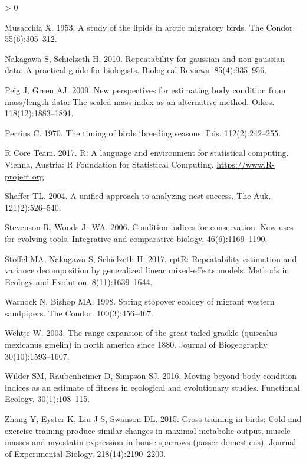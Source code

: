 \documentclass[
]{article}
\newlength{\cslhangindent}
\newenvironment{CSLReferences}[2] %
 {%
  \setlength{\parindent}{0pt}
  \ifodd #1 \everypar{\setlength{\hangindent}{\cslhangindent}}\ignorespaces\fi
  \ifnum #2 > 0
  \setlength{\parskip}{#2\baselineskip}
  \fi
 }%
 {}
\begin{document}
\begin{CSLReferences}{0}{0}
\leavevmode\hypertarget{ref-musacchia1953study}{}%
Musacchia X. 1953. A study of the lipids in arctic migratory birds. The
Condor. 55(6):305--312.

\leavevmode\hypertarget{ref-nakagawa2010repeatability}{}%
Nakagawa S, Schielzeth H. 2010. Repeatability for gaussian and
non-gaussian data: A practical guide for biologists. Biological Reviews.
85(4):935--956.

\leavevmode\hypertarget{ref-peig2009new}{}%
Peig J, Green AJ. 2009. New perspectives for estimating body condition
from mass/length data: The scaled mass index as an alternative method.
Oikos. 118(12):1883--1891.

\leavevmode\hypertarget{ref-perrins1970timing}{}%
Perrins C. 1970. The timing of birds `breeding seasons. Ibis.
112(2):242--255.

\leavevmode\hypertarget{ref-rcoreteam}{}%
R Core Team. 2017. R: A language and environment for statistical
computing. Vienna, Austria: R Foundation for Statistical Computing.
\url{https://www.R-project.org}.

\leavevmode\hypertarget{ref-shaffer2004unified}{}%
Shaffer TL. 2004. A unified approach to analyzing nest success. The Auk.
121(2):526--540.

\leavevmode\hypertarget{ref-stevenson2006condition}{}%
Stevenson R, Woods Jr WA. 2006. Condition indices for conservation: New
uses for evolving tools. Integrative and comparative biology.
46(6):1169--1190.

\leavevmode\hypertarget{ref-stoffel2017rptr}{}%
Stoffel MA, Nakagawa S, Schielzeth H. 2017. rptR: Repeatability
estimation and variance decomposition by generalized linear
mixed-effects models. Methods in Ecology and Evolution.
8(11):1639--1644.

\leavevmode\hypertarget{ref-warnock1998spring}{}%
Warnock N, Bishop MA. 1998. Spring stopover ecology of migrant western
sandpipers. The Condor. 100(3):456--467.

\leavevmode\hypertarget{ref-wehtje2003range}{}%
Wehtje W. 2003. The range expansion of the great-tailed grackle
(quiscalus mexicanus gmelin) in north america since 1880. Journal of
Biogeography. 30(10):1593--1607.

\leavevmode\hypertarget{ref-wilder2016moving}{}%
Wilder SM, Raubenheimer D, Simpson SJ. 2016. Moving beyond body
condition indices as an estimate of fitness in ecological and
evolutionary studies. Functional Ecology. 30(1):108--115.

\leavevmode\hypertarget{ref-zhang2015cross}{}%
Zhang Y, Eyster K, Liu J-S, Swanson DL. 2015. Cross-training in birds:
Cold and exercise training produce similar changes in maximal metabolic
output, muscle masses and myostatin expression in house sparrows (passer
domesticus). Journal of Experimental Biology. 218(14):2190--2200.

\end{CSLReferences}
\end{document}
